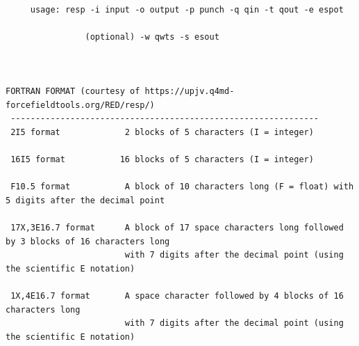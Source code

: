 \documentclass[a4paper]{article}
\begin{document}
\begin{tcolorbox}
\begin{verbatim}
 
     usage: resp -i input -o output -p punch -q qin -t qout -e espot 
 
                (optional) -w qwts -s esout 
 


FORTRAN FORMAT (courtesy of https://upjv.q4md-forcefieldtools.org/RED/resp/)
 --------------------------------------------------------------
 2I5 format             2 blocks of 5 characters (I = integer)

 16I5 format           16 blocks of 5 characters (I = integer)
 
 F10.5 format           A block of 10 characters long (F = float) with 5 digits after the decimal point
 
 17X,3E16.7 format      A block of 17 space characters long followed by 3 blocks of 16 characters long
                        with 7 digits after the decimal point (using the scientific E notation)
 
 1X,4E16.7 format       A space character followed by 4 blocks of 16 characters long
                        with 7 digits after the decimal point (using the scientific E notation)
\end{verbatim}
\end{tcolorbox}



\end{document}
